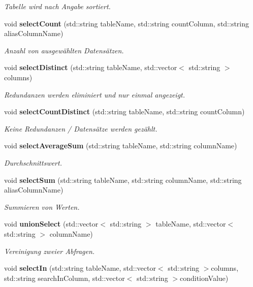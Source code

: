 \begin{DoxyCompactItemize}
\begin{DoxyCompactList}\small\item\em Tabelle wird nach Angabe sortiert. \end{DoxyCompactList}\item 
void \textbf{ select\+Count} (std\+::string table\+Name, std\+::string count\+Column, std\+::string alias\+Column\+Name)
\begin{DoxyCompactList}\small\item\em Anzahl von ausgewählten Datensätzen. \end{DoxyCompactList}\item 
void \textbf{ select\+Distinct} (std\+::string table\+Name, std\+::vector$<$ std\+::string $>$ columns)
\begin{DoxyCompactList}\small\item\em Redundanzen werden eliminiert und nur einmal angezeigt. \end{DoxyCompactList}\item 
void \textbf{ select\+Count\+Distinct} (std\+::string table\+Name, std\+::string count\+Column)
\begin{DoxyCompactList}\small\item\em Keine Redundanzen / Datensätze werden gezählt. \end{DoxyCompactList}\item 
void \textbf{ select\+Average\+Sum} (std\+::string table\+Name, std\+::string column\+Name)
\begin{DoxyCompactList}\small\item\em Durchschnittswert. \end{DoxyCompactList}\item 
void \textbf{ select\+Sum} (std\+::string table\+Name, std\+::string column\+Name, std\+::string alias\+Column\+Name)
\begin{DoxyCompactList}\small\item\em Summieren von Werten. \end{DoxyCompactList}\item 
void \textbf{ union\+Select} (std\+::vector$<$ std\+::string $>$ table\+Name, std\+::vector$<$ std\+::string $>$ column\+Name)
\begin{DoxyCompactList}\small\item\em Vereinigung zweier Abfragen. \end{DoxyCompactList}\item 
void \textbf{ select\+In} (std\+::string table\+Name, std\+::vector$<$ std\+::string $>$columns, std\+::string search\+In\+Column, std\+::vector$<$ std\+::string $>$condition\+Value)

\end{DoxyCompactItemize}
